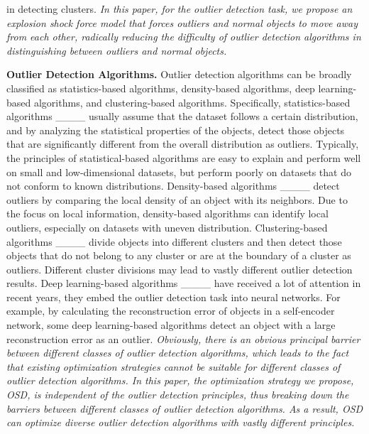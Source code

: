 in detecting clusters. \emph{In this paper, for the outlier detection task, we propose an explosion shock force model that forces outliers and normal objects to move away from each other, radically reducing the difficulty of outlier detection algorithms in distinguishing between outliers and normal objects.}


\textbf{Outlier Detection Algorithms.} Outlier detection algorithms can be broadly classified as statistics-based algorithms, density-based algorithms, deep learning-based algorithms, and clustering-based algorithms. Specifically, statistics-based algorithms ____ usually assume that the dataset follows a certain distribution, and by analyzing the statistical properties of the objects, detect those objects that are significantly different from the overall distribution as outliers. Typically, the principles of statistical-based algorithms are easy to explain and perform well on small and low-dimensional datasets, but perform poorly on datasets that do not conform to known distributions. Density-based algorithms ____ detect outliers by comparing the local density of an object with its neighbors. Due to the focus on local information, density-based algorithms can identify local outliers, especially on datasets with uneven distribution. Clustering-based algorithms ____ divide objects into different clusters and then detect those objects that do not belong to any cluster or are at the boundary of a cluster as outliers. Different cluster divisions may lead to vastly different outlier detection results. Deep learning-based algorithms ____ have received a lot of attention in recent years, they embed the outlier detection task into neural networks. For example, by calculating the reconstruction error of objects in a self-encoder network, some deep learning-based algorithms detect an object with a large reconstruction error as an outlier. \emph{Obviously, there is an obvious principal barrier between different classes of outlier detection algorithms, which leads to the fact that existing optimization strategies cannot be suitable for different classes of outlier detection algorithms. In this paper, the optimization strategy we propose, OSD, is independent of the outlier detection principles, thus breaking down the barriers between different classes of outlier detection algorithms. As a result, OSD can optimize diverse outlier detection algorithms with vastly different principles.}
